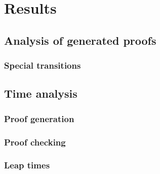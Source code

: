 \chapter{Results\label{chap:results}}

\section{Analysis of generated proofs}

\subsection{Special transitions}

\section{Time analysis}

\subsection{Proof generation}

\subsection{Proof checking}


\subsection{Leap times}


